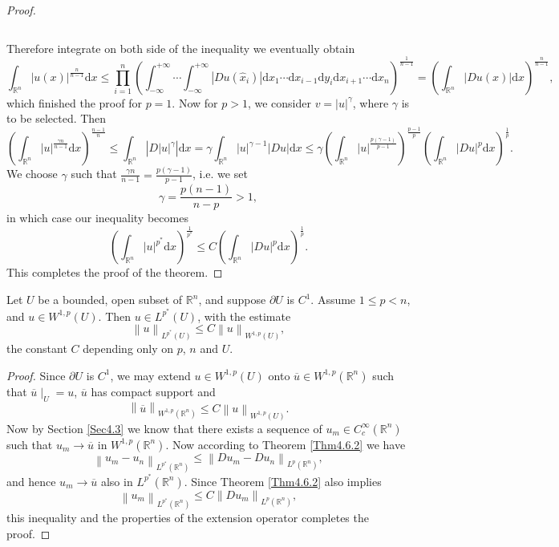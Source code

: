 \begin{proof}
\begin{small}
$$$$
\end{small}
Therefore integrate on both side of the inequality we eventually obtain 
$$
\int_{\mathbb{R} ^n}{\left| u\left( x \right) \right|^{\frac{n}{n-1}}\mathrm{d}x}\le \prod_{i=1}^n{\left( \int_{-\infty}^{+\infty}{\cdots \int_{-\infty}^{+\infty}{\left| Du\left( \widehat{x}_i \right) \right|\mathrm{d}x_1\cdots \mathrm{d}x_{i-1}\mathrm{d}y_i\mathrm{d}x_{i+1}\cdots \mathrm{d}x_n}} \right) ^{\frac{1}{n-1}}}=\left( \int_{\mathbb{R} ^n}{\left| Du\left( x \right) \right|\mathrm{d}x} \right) ^{\frac{n}{n-1}},
$$
which finished the proof for $p=1$. Now for $p>1$, we consider $v=|u|^\gamma$, where $\gamma$ is to be selected. Then 
$$
\left( \int_{\mathbb{R} ^n}{\left| u \right|^{\frac{\gamma n}{n-1}}\mathrm{d}x} \right) ^{\frac{n-1}{n}}\le \int_{\mathbb{R} ^n}{\left| D\left| u \right|^{\gamma} \right|\mathrm{d}x}=\gamma \int_{\mathbb{R} ^n}{\left| u \right|^{\gamma -1}\left| Du \right|\mathrm{d}x}\le \gamma \left( \int_{\mathbb{R} ^n}{\left| u \right|^{\frac{p\left( \gamma -1 \right)}{p-1}}} \right) ^{\frac{p-1}{p}}\left( \int_{\mathbb{R} ^n}{\left| Du \right|^p\mathrm{d}x} \right) ^{\frac{1}{p}}.
$$
We choose $\gamma$ such that $\frac{\gamma n}{n-1}=\frac{p(\gamma-1)}{p-1}$, i.e. we set 
$$
\gamma =\frac{p\left( n-1 \right)}{n-p}>1,
$$
in which case our inequality becomes 
$$
\left( \int_{\mathbb{R} ^n}{\left| u \right|^{p^*}\mathrm{d}x} \right) ^{\frac{1}{p^*}}\le C\left( \int_{\mathbb{R} ^n}{\left| Du \right|^p\mathrm{d}x} \right) ^{\frac{1}{p}}.
$$
This completes the proof of the theorem.
\end{proof}
\begin{theorem}
Let $U$ be a bounded, open subset of $\mathbb{R}^n$, and suppose $\partial U$ is $C^1$. Assume $1\le p<n$, and $u\in W^{1,p}(U)$. Then $u\in L^{p^*}(U)$, with the estimate 
$$
\left\| u \right\| _{L^{p^*}\left( U \right)}\le C\left\| u \right\| _{W^{1,p}\left( U \right)},
$$
the constant $C$ depending only on $p$, $n$ and $U$.
\end{theorem}
\begin{proof}
Since $\partial U$ is $C^1$, we may extend $u\in W^{1,p}(U)$ onto $\overline{u}\in W^{1,p}(\mathbb{R}^n)$ such that $\overline{u}\mid_{U}=u$, $\overline{u}$ has compact support and 
$$
\left\| \overline{u} \right\| _{W^{1,p}\left( \mathbb{R} ^n \right)}\le C\left\| u \right\| _{W^{1,p}\left( U \right)}.
$$
Now by Section \ref{Sec4.3} we know that there exists a sequence of $u_m\in C_c^\infty(\mathbb{R}^n)$ such that $u_m\to\overline{u}$ in $W^{1,p}(\mathbb{R}^n)$. Now according to Theorem \ref{Thm4.6.2} we have 
$$
\left\| u_m-u_n \right\| _{L^{p^*}\left( \mathbb{R} ^n \right)}\le \left\| Du_m-Du_n \right\| _{L^p\left( \mathbb{R} ^n \right)},
$$
and hence $u_m\to\overline{u}$ also in $L^{p^*}(\mathbb{R}^n)$. Since Theorem \ref{Thm4.6.2} also implies 
$$
\left\| u_m \right\| _{L^{p^*}\left( \mathbb{R} ^n \right)}\le C\left\| Du_m \right\| _{L^p\left( \mathbb{R} ^n \right)},
$$
this inequality and the properties of the extension operator completes the proof.
\end{proof}
